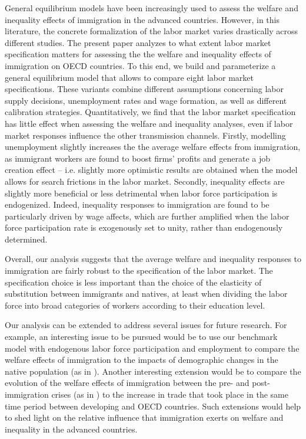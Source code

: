 \documentclass[a4paper,12pt]{article}
\begin{document}
General equilibrium models have been increasingly used to assess the welfare and inequality effects of immigration in the advanced countries. However, in this literature, the concrete formalization of the labor market varies drastically across different studies. The present paper analyzes to what extent labor market specification matters for assessing the the welfare and inequality effects of immigration on OECD countries. To this end, we build and parameterize a general equilibrium model that allows to compare eight labor market specifications. These variants combine different assumptions concerning labor supply decisions, unemployment rates and wage formation, as well as different calibration strategies. Quantitatively, we find that the labor market specification has little effect when assessing the welfare and inequality analyses, even if labor market responses influence the other transmission channels. Firstly, modelling unemployment slightly increases the the average welfare effects from immigration, as immigrant workers are found to boost firms' profits and generate a job creation effect -- i.e. slightly more optimistic results are obtained when the model allows for search frictions in the labor market. Secondly, inequality effects are slightly more beneficial or less detrimental when labor force participation is endogenized. Indeed, inequality responses to immigration are found to be particularly driven by wage affects, which are further amplified when the labor force participation rate is exogenously set to unity, rather than endogenously determined.

Overall, our analysis suggests that the average welfare and inequality responses to immigration are fairly robust to the specification of the labor market. The specification choice is less important than the choice of the elasticity of substitution between immigrants and natives, at least when dividing the labor force into broad categories of workers according to their education level.

Our analysis can be extended to address several issues for future research. For example, an interesting issue to be pursued would be to use our benchmark model with endogenous labor force participation and employment to compare the welfare effects of immigration to the impacts of demographic changes in the native population (as in \cite{Docquier2019}). Another interesting extension would be to compare the evolution of the welfare effects of immigration between the pre- and post- immigration crises (as in \cite{Burzynski2018}) to the increase in trade that took place in the same time period between developing and OECD countries. Such extensions would help to shed light on the relative influence that immigration exerts on welfare and inequality in the advanced countries.
\end{document}
